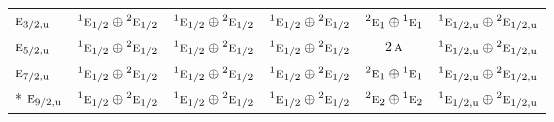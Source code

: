 \documentclass[10pt,a4paper]{article}
\numberwithin{equation}{section}
\newcommand{\irr}[1]{\text{\normalfont\scshape #1}}
\newcommand{\conjpair}[1]{{}^{#1}}
\newcommand{\ptag}[1]{\mathrm{#1}}
\begin{document}
{\begin{longtable}{@{}lccccc@{}}
$\irr{e}_{3/2,\ptag{u}}$ & $\conjpair{1}\irr{e}_{1/2}\oplus \conjpair{2}\irr{e}_{1/2}$ & $\conjpair{1}\irr{e}_{1/2}\oplus \conjpair{2}\irr{e}_{1/2}$ & $\conjpair{1}\irr{e}_{1/2}\oplus \conjpair{2}\irr{e}_{1/2}$ & $\conjpair{2}\irr{e}_{1}\oplus \conjpair{1}\irr{e}_{1}$ & $\conjpair{1}\irr{e}_{1/2,\ptag{u}}\oplus \conjpair{2}\irr{e}_{1/2,\ptag{u}}$\\
$\irr{e}_{5/2,\ptag{u}}$ & $\conjpair{1}\irr{e}_{1/2}\oplus \conjpair{2}\irr{e}_{1/2}$ & $\conjpair{1}\irr{e}_{1/2}\oplus \conjpair{2}\irr{e}_{1/2}$ & $\conjpair{1}\irr{e}_{1/2}\oplus \conjpair{2}\irr{e}_{1/2}$ & $2\,\irr{a}$ & $\conjpair{1}\irr{e}_{1/2,\ptag{u}}\oplus \conjpair{2}\irr{e}_{1/2,\ptag{u}}$\\
$\irr{e}_{7/2,\ptag{u}}$ & $\conjpair{1}\irr{e}_{1/2}\oplus \conjpair{2}\irr{e}_{1/2}$ & $\conjpair{1}\irr{e}_{1/2}\oplus \conjpair{2}\irr{e}_{1/2}$ & $\conjpair{1}\irr{e}_{1/2}\oplus \conjpair{2}\irr{e}_{1/2}$ & $\conjpair{2}\irr{e}_{1}\oplus \conjpair{1}\irr{e}_{1}$ & $\conjpair{1}\irr{e}_{1/2,\ptag{u}}\oplus \conjpair{2}\irr{e}_{1/2,\ptag{u}}$\\*
$\irr{e}_{9/2,\ptag{u}}$ & $\conjpair{1}\irr{e}_{1/2}\oplus \conjpair{2}\irr{e}_{1/2}$ & $\conjpair{1}\irr{e}_{1/2}\oplus \conjpair{2}\irr{e}_{1/2}$ & $\conjpair{1}\irr{e}_{1/2}\oplus \conjpair{2}\irr{e}_{1/2}$ & $\conjpair{2}\irr{e}_{2}\oplus \conjpair{1}\irr{e}_{2}$ & $\conjpair{1}\irr{e}_{1/2,\ptag{u}}\oplus \conjpair{2}\irr{e}_{1/2,\ptag{u}}$\\
\bottomrule\end{longtable}}
\end{document}
